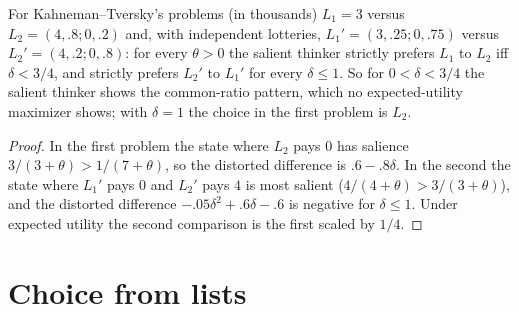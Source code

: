 \begin{theorem}
\label{thm:beh-salience-common-ratio}
\leanok
For Kahneman--Tversky's problems (in thousands) $L_1=3$ versus $L_2=(4,.8;0,.2)$ and, with independent lotteries,
$L_1'=(3,.25;0,.75)$ versus $L_2'=(4,.2;0,.8)$: for every $\theta>0$ the salient thinker strictly prefers $L_1$ to $L_2$ iff
$\delta<3/4$, and strictly prefers $L_2'$ to $L_1'$ for every $\delta\le1$. So for $0<\delta<3/4$ the salient thinker
shows the common-ratio pattern, which no expected-utility maximizer shows; with $\delta=1$ the choice in the first problem
is $L_2$.
\end{theorem}
\begin{proof}
\leanok
In the first problem the state where $L_2$ pays $0$ has salience $3/(3+\theta)>1/(7+\theta)$, so the distorted difference is
$.6-.8\delta$. In the second the state where $L_1'$ pays $0$ and $L_2'$ pays $4$ is most salient ($4/(4+\theta)>3/(3+\theta)$),
and the distorted difference $-.05\delta^2+.6\delta-.6$ is negative for $\delta\le1$. Under expected utility the second
comparison is the first scaled by $1/4$.
\end{proof}

\section{Choice from lists}
\label{sec:beh-lists}

